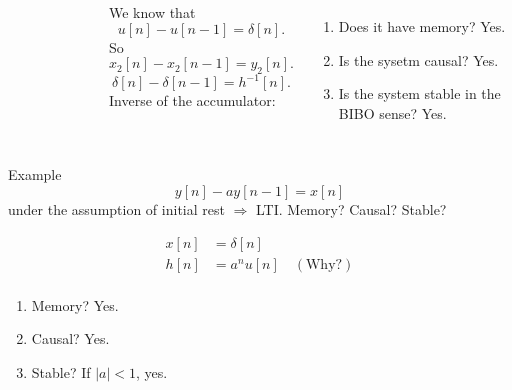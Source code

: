 \begin{frame}[plain]


    {
        \begin{columns}
                \begin{figure}
                  \centering
                  
                  \caption{}\label{fi:accumulator_inverse}
                \end{figure}
                We know that
                \begin{equation*}
                    u[n] - u[n-1] = \delta[n].
                \end{equation*}
                So
                \begin{equation*}
                    x_2[n] - x_2[n-1] = y_2[n].
                \end{equation*}
                \begin{equation*}
                    \delta[n] - \delta[n-1] = h^{-1}[n].
                \end{equation*}
            Inverse of the accumulator:
            \begin{enumerate}
              \item Does it have memory? Yes.
              \item Is the sysetm causal? Yes.
              \item Is the system stable in the BIBO sense? Yes.
            \end{enumerate}

        \end{columns}
    }
\end{frame}


\begin{frame}{Example}
    \begin{equation*}
        y[n] - ay[n-1] = x[n]
    \end{equation*}
    under the assumption of initial rest $\Rightarrow$ LTI.
    Memory? Causal? Stable?
    \pause
    {
        \begin{align*}
          x[n] &= \delta[n] \\
          h[n] &= a^nu[n] \quad (\text{Why?})\\
        \end{align*}
        \pause
            \begin{enumerate}
              \item Memory? Yes.
              \item Causal? Yes.
              \item Stable? If $|a|<1$, yes.
            \end{enumerate}
    }
\end{frame}

